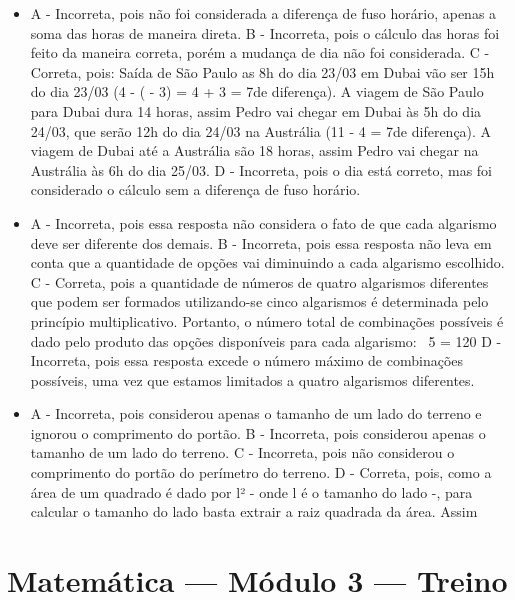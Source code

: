 \begin{itemize}
\item A - Incorreta, pois não foi considerada a diferença de fuso horário,
apenas a soma das horas de maneira direta.
B - Incorreta, pois o cálculo das horas foi feito da maneira correta,
porém a mudança de dia não foi considerada.
C - Correta, pois: Saída de São Paulo as 8h do dia 23/03 \rightarrow em Dubai vão ser
15h do dia 23/03 (4 - ( - 3) = 4 + 3 = 7de diferença). A viagem de São Paulo para Dubai dura 14 horas, assim Pedro vai chegar
em Dubai às 5h do dia 24/03, que serão 12h do dia 24/03 na Austrália
(11 - 4 = 7de diferença). A viagem de Dubai até a Austrália são 18 horas, assim Pedro vai chegar
na Austrália às 6h do dia 25/03.
D - Incorreta, pois o dia está correto, mas foi considerado o cálculo
sem a diferença de fuso horário.
\item A - Incorreta, pois essa resposta não considera o fato de que cada
algarismo deve ser diferente dos demais.
B - Incorreta, pois essa resposta não leva em conta que a quantidade de
opções vai diminuindo a cada algarismo escolhido.
C - Correta, pois a quantidade de números de quatro algarismos
diferentes que podem ser formados utilizando-se cinco algarismos é
determinada pelo princípio multiplicativo. Portanto, o número total de
combinações possíveis é dado pelo produto das opções disponíveis para
cada algarismo: \ 5   = 120
D - Incorreta, pois essa resposta excede o número máximo de combinações
possíveis, uma vez que estamos limitados a quatro algarismos diferentes.
\item A - Incorreta, pois considerou apenas o tamanho de um lado do terreno e
ignorou o comprimento do portão.
B - Incorreta, pois considerou apenas o tamanho de um lado do terreno.
C - Incorreta, pois não considerou o comprimento do portão do perímetro
do terreno.
D - Correta, pois, como a área de um quadrado é dado por l² - onde l é o
tamanho do lado -, para calcular o tamanho do lado basta extrair a raiz
quadrada da área. Assim
\end{itemize}

\section*{Matemática — Módulo 3 — Treino}

